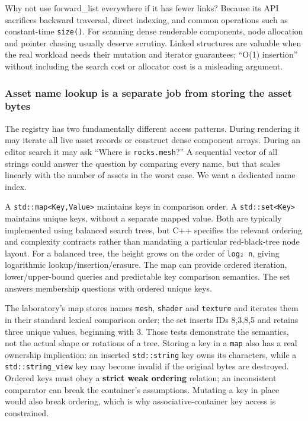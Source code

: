 Why not use forward\_list everywhere if it has fewer links? Because its API sacrifices backward traversal, direct indexing, and common operations such as constant-time \texttt{size()}. For scanning dense renderable components, node allocation and pointer chasing usually deserve scrutiny. Linked structures are valuable when the real workload needs their mutation and iterator guarantees; ``O(1) insertion'' without including the search cost or allocator cost is a misleading argument.

\subsubsection{Asset name lookup is a separate job from storing the asset bytes}\label{asset-name-lookup-is-a-separate-job-from-storing-the-asset-bytes}

The registry has two fundamentally different access patterns. During rendering it may iterate all live asset records or construct dense component arrays. During an editor search it may ask ``Where is \texttt{rocks.mesh}?'' A sequential vector of all strings could answer the question by comparing every name, but that scales linearly with the number of assets in the worst case. We want a dedicated name index.

A \texttt{std::map\textless{}Key,Value\textgreater{}} maintains keys in comparison order. A \texttt{std::set\textless{}Key\textgreater{}} maintains unique keys, without a separate mapped value. Both are typically implemented using balanced search trees, but C++ specifies the relevant ordering and complexity contracts rather than mandating a particular red-black-tree node layout. For a balanced tree, the height grows on the order of \texttt{log₂\ n}, giving logarithmic lookup/insertion/erasure. The map can provide ordered iteration, lower/upper-bound queries and predictable key comparison semantics. The set answers membership questions with ordered unique keys.

The laboratory's map stores names \texttt{mesh}, \texttt{shader} and \texttt{texture} and iterates them in their standard lexical comparison order; the set inserts IDs 8,3,8,5 and retains three unique values, beginning with 3. Those tests demonstrate the semantics, not the actual shape or rotations of a tree. Storing a key in a \texttt{map} also has a real ownership implication: an inserted \texttt{std::string} key owns its characters, while a \texttt{std::string\_view} key may become invalid if the original bytes are destroyed. Ordered keys must obey a \textbf{strict weak ordering} relation; an inconsistent comparator can break the container's assumptions. Mutating a key in place would also break ordering, which is why associative-container key access is constrained.

